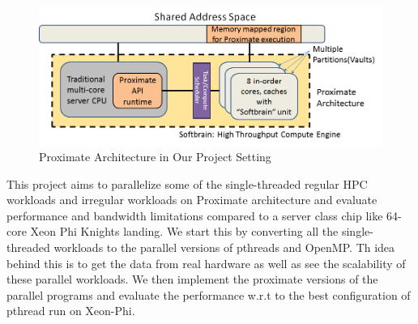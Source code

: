 \begin{figure}[h]
  \begin{center}
    \includegraphics[width=\linewidth]{cs758-figs/proj.png}
  \end{center}
\vspace{-0.2in}
  \caption{Proximate Architecture in Our Project Setting}
  \label{fig:prx}
\vspace{-0.05in}
\end{figure}

This project aims to parallelize some of the 
single-threaded regular HPC workloads and 
irregular workloads on Proximate architecture 
and evaluate performance and bandwidth 
limitations compared to a server class chip 
like 64-core Xeon Phi Knights landing.
We start this by converting all the single-threaded workloads
to the parallel versions of pthreads and OpenMP. Th idea behind this
is to get the data from real hardware as well as see the scalability of these parallel workloads.
We then implement the proximate versions of the parallel programs and evaluate the performance
w.r.t to the best configuration of pthread run on Xeon-Phi. 



